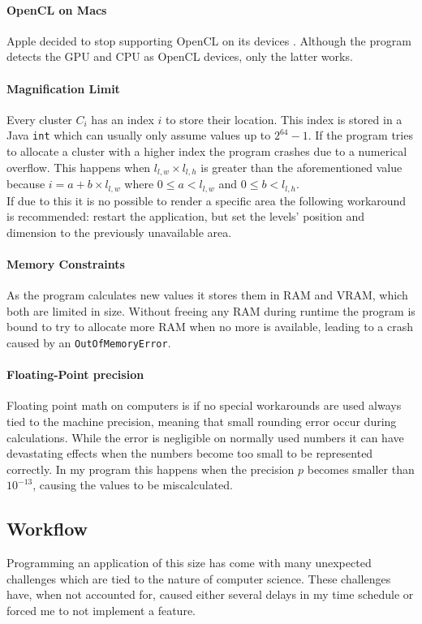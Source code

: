 \documentclass[10pt,a4paper,titlepage]{article}
\begin{document}
	\paragraph{OpenCL on Macs}
	Apple decided to stop supporting OpenCL on its devices \cite{appleinsider}. Although the program detects the GPU and CPU as OpenCL devices, only the latter works.
	\paragraph{Magnification Limit}
	Every cluster \(C_i\) has an index \(i\) to store their location. This index is stored in a Java \verb|int| which can usually only assume values up to \(2^{64} - 1\). If the program tries to allocate a cluster with a higher index the program crashes due to a numerical overflow. This happens when \(l_{l,w} \times l_{l,h}\) is greater than the aforementioned value because \(i = a + b \times l_{l,w}\) where \(0 \leq a < l_{l,w}\) and \(0 \leq b < l_{l,h}\).\\
	If due to this it is no possible to render a specific area the following workaround is recommended: restart the application, but set the levels' position and dimension to the previously unavailable area.
	\paragraph{Memory Constraints}\label{sec:memory_problem}
	As the program calculates new values it stores them in RAM and VRAM, which both are limited in size. Without freeing any RAM during runtime the program is bound to try to allocate more RAM when no more is available, leading to a crash caused by an \verb|OutOfMemoryError|.
	\paragraph{Floating-Point precision}
	Floating point math on computers is if no special workarounds are used always tied to the machine precision, meaning that small rounding error occur during calculations. While the error is negligible on normally used numbers it can have devastating effects when the numbers become too small to be represented correctly. In my program this happens when the precision \(p\) becomes smaller than \(10^{-13}\), causing the values to be miscalculated.
	\subsection{Workflow}
	Programming an application of this size has come with many unexpected challenges which are tied to the nature of computer science. These challenges have, when not accounted for, caused either several delays in my time schedule or forced me to not implement a feature.
\end{document}
